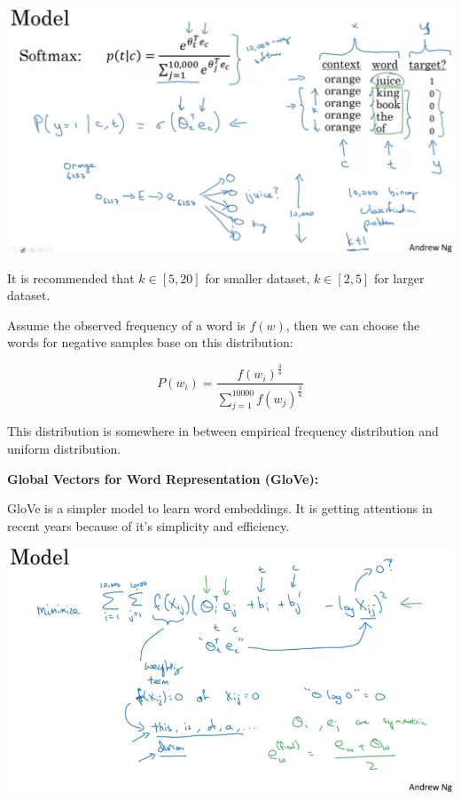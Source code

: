 \documentclass{article}
\begin{document}
\begin{center}
\includegraphics[scale=0.3]{./images/negative_sampling_model.png}
\end{center}

\noindent It is recommended that \(k \in [5, 20]\) for smaller dataset, \(k \in [2, 5]\) for larger dataset.

\bigskip

\noindent Assume the observed frequency of a word is \(f(w)\), then we can choose the words for negative samples base on this distribution:

\[P(w_{i}) = \frac{f(w_{i})^{\frac{3}{4}}}{\sum_{j = 1}^{10000} f(w_{j})^{\frac{3}{4}}}\]

\noindent This distribution is somewhere in between empirical frequency distribution and uniform distribution.

\bigskip

\noindent \textbf{Global Vectors for Word Representation (GloVe):}

\noindent GloVe is a simpler model to learn word embeddings. It is getting attentions in recent years because of it's simplicity and efficiency.

\begin{center}
\includegraphics[scale=0.3]{./images/glove.png}
\end{center}
\end{document}
